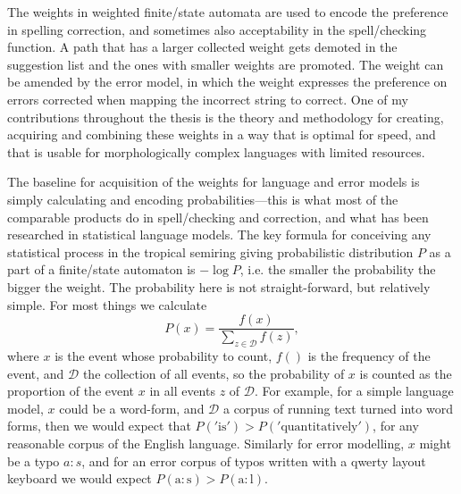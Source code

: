 \documentclass[officiallayout]{unihelcompling}
\begin{document}
The weights in weighted finite\-/state automata are used to encode the preference
in spelling correction, and sometimes also acceptability in the
spell\-/checking function. A path that has a larger collected weight gets
demoted in the suggestion list and the ones with smaller weights are promoted.
The weight can be amended by the error model, in which the weight expresses the
preference on errors corrected when mapping the incorrect string to correct.
One of my contributions throughout the thesis is the theory and methodology for
creating, acquiring and combining these weights in a way that is optimal for
speed, and that is usable for morphologically complex languages with limited
resources.

The baseline for acquisition of the weights for language and error models is
simply calculating and encoding probabilities---this is what most of the
comparable products do in spell\-/checking and correction, and what has been
researched in statistical language models. The key formula for conceiving any
statistical process in the tropical semiring giving probabilistic distribution
$P$ as a part of a finite\-/state automaton is $-\log P$, i.e. the smaller the
probability the bigger the weight. The probability here is not
straight-forward, but relatively simple. For most things we calculate 
\begin{equation}
    P(x) = \frac{f(x)}{\sum_{z \in \mathcal{D}} f(z)},
\end{equation}
where $x$ is the event whose probability to count, $f()$ is the frequency of
the event, and $\mathcal{D}$ the collection of all events, so the probability
of $x$ is counted as the proportion of the event $x$ in all events $z$ of
$\mathcal{D}$. For example, for a simple language model, $x$ could be a
word-form, and $\mathcal{D}$ a corpus of running text turned into word forms,
then we would expect that $P('\mathrm{is}') > P('\mathrm{quantitatively}')$,
for any reasonable corpus of the English language. Similarly for error
modelling, $x$ might be a typo $a:s$, and for an error corpus of typos written
with a qwerty layout keyboard we would expect $P(\mathrm{a}:\mathrm{s}) >
P(\mathrm{a}:\mathrm{l})$.
\end{document}
